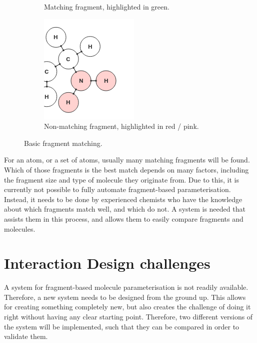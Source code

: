 \begin{figure}[h!]
\begin{subfigure}[t]{0.29\textwidth}
\caption{Matching fragment, highlighted in green.}
\end{subfigure}%
\qquad
\begin{subfigure}[t]{0.29\textwidth}
\centering
\includegraphics[width=\textwidth]{img/match_3.png}
\caption{Non-matching fragment, highlighted in red / pink.}
\end{subfigure}
\caption{Basic fragment matching.}
\end{figure}

For an atom, or a set of atoms, usually many matching fragments will be found. Which of those fragments is the best match depends on many factors, including the fragment size and type of molecule they originate from. Due to this, it is currently not possible to fully automate fragment-based parameterisation. Instead, it needs to be done by experienced chemists who have the knowledge about which fragments match well, and which do not. A system is needed that assists them in this process, and allows them to easily compare fragments and molecules.



\section{Interaction Design challenges}
A system for fragment-based molecule parameterisation is not readily available. Therefore, a new system needs to be designed from the ground up. This allows for creating something completely new, but also creates the challenge of doing it right without having any clear starting point. Therefore, two different versions of the system will be implemented, such that they can be compared in order to validate them.

